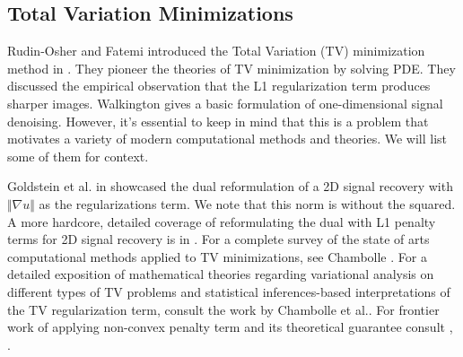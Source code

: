 \documentclass[]{article}
\theoremstyle{definition}
\numberwithin{equation}{subsection}
\begin{document}
    \subsection{Total Variation Minimizations}
        Rudin-Osher and Fatemi introduced the Total Variation (TV) minimization method in \cite{rudin_nonlinear_1992}. 
        They pioneer the theories of TV minimization by solving PDE. 
        They discussed the empirical observation that the L1 regularization term produces sharper images. 
        Walkington \cite{noel_nesterovs_nodate} gives a basic formulation of one-dimensional signal denoising. 
        However, it's essential to keep in mind that this is a problem that motivates a variety of modern computational methods and theories. 
        We will list some of them for context. 
        \par
        Goldstein et al. in \cite[3.2.1]{goldstein_field_2016} showcased the dual reformulation of a 2D signal recovery with $\Vert \nabla u\Vert$ as the regularizations term. 
        We note that this norm is without the squared. 
        A more hardcore, detailed coverage of reformulating the dual with L1 penalty terms for 2D signal recovery is in \cite{beck_fast_2009}. 
        For a complete survey of the state of arts computational methods applied to TV minimizations, see Chambolle \cite{chambolle_introduction_2016}. 
        For a detailed exposition of mathematical theories regarding variational analysis on different types of TV problems and statistical inferences-based interpretations of the TV regularization term, consult the work by Chambolle et al.\cite{fornasier_introduction_2010}.
        For frontier work of applying non-convex penalty term and its theoretical guarantee consult \cite{an_enhanced_2023}, \cite{an_springback_2022}. 
\end{document}
